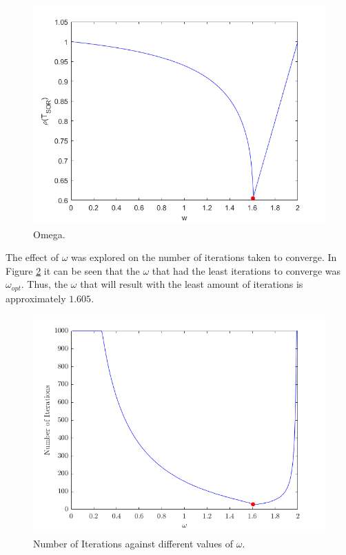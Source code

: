 \documentclass[12pt,a4paper]{article}
\begin{document}
\begin{figure}[H]
	\includegraphics[width=\linewidth]{images/omegaGraph1.png}
	\caption{Omega.}
	\label{fig:omega1}
\end{figure}

The effect of $\omega$ was explored on the number of iterations taken to converge. In Figure \ref{fig:omega2} it can be seen that the $\omega$ that had the least iterations to converge was $\omega_{opt}$. Thus, the $\omega$ that will result with the least amount of iterations is approximately $1.605$.

\begin{figure}[H]
	\includegraphics[width=\linewidth]{images/omegaGraph2.png}
	\caption{Number of Iterations against different values of $\omega$.}
	\label{fig:omega2}
\end{figure}
\end{document}
